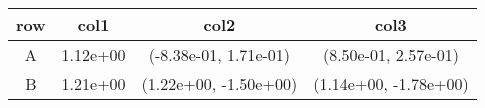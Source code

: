 \begin{tabular}{cccc}
\toprule
row&col1&col2&col3\tabularnewline
\midrule
A&1.12e+00& (-8.38e-01, 1.71e-01)& (8.50e-01, 2.57e-01)\tabularnewline
B&1.21e+00& (1.22e+00, -1.50e+00)& (1.14e+00, -1.78e+00)\tabularnewline
\bottomrule
\end{tabular}
